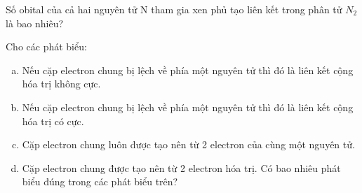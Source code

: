 \begin{bt}[CD-SBT] Số obital của cả hai nguyên tử N tham gia xen phủ tạo liên kết trong phân tử $N_2$ là bao nhiêu?
\end{bt}
\begin{bt}[CD-SGK] Cho các phát biểu:
	\begin{enumerate}[a)]
		\item Nếu cặp electron chung bị lệch về phía một nguyên tử thì đó là liên kết cộng hóa trị không cực.
		\item Nếu cặp electron chung bị lệch về phía một nguyên tử thì đó là liên kết cộng hóa trị có cực.
		\item Cặp electron chung luôn được tạo nên từ 2 electron của cùng một nguyên tử.
		\item Cặp electron chung được tạo nên từ 2 electron hóa trị. Có bao nhiêu phát biểu đúng trong các phát biểu trên?
	\end{enumerate}
\end{bt}

